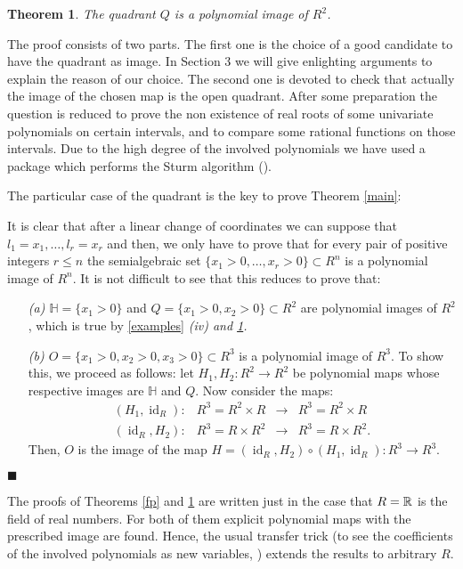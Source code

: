 \documentclass[11pt,draft]{article}
\newenvironment{proofmain}%
	{\par\noindent{\it Proof of Theorem \ref{main}.}\nopagebreak\normalsize}%
	{\hfill\linebreak[2]\hspace*{\fill}$\blacksquare$\\[5pt]}
\newtheorem{thm}{Theorem}[section]
\newcommand{\HH}{{\mathbb H}} \newcommand{\BB}{{\mathbb B}}
\newcommand{\id}{\operatorname{id}}
\begin{document}
\begin{thm}\label{q}
The quadrant $Q$ is a polynomial image of $R^2$.
\end{thm} 

The proof consists of two parts. The first one is the choice of a good candidate
to have the quadrant as image. In Section 3 we will give enlighting arguments to
explain the reason of our choice. The second one is devoted to check that
actually the image of the chosen map is the open quadrant. After some
preparation the question is reduced to prove the non existence of real roots of
some univariate polynomials on certain intervals, and to
compare some rational functions on those intervals. Due to the high degree of
the involved polynomials we have used a package which performs the Sturm
algorithm (\cite[1.2.10]{bcr}).

The particular case of the quadrant is the key to prove Theorem \ref{main}: 

\begin{proofmain}
It is clear that after a linear change of coordinates we can suppose that $l_1=x_1,\ldots,l_r=x_r$ 
and then, we only have to prove that
for every pair of positive integers $r\leq n$ the semialgebraic set 
$\{x_1>0,\ldots,x_r>0\}\subset R^n$ is a polynomial image of $ R^n$. It is not difficult to
see that this reduces to prove that:
\begin{itemize}
\item [\em (a) \em] $\HH=\{x_1>0\}$ and $Q=\{x_1>0,x_2>0\}\subset R^2$ are polynomial images
of $R^2$, which is true by \ref{examples} \em (iv) \em and \ref{q}.
\item [\em (b) \em] $O=\{x_1>0,x_2>0,x_3>0\}\subset R^3$ is a polynomial image of $R^3$. 
To show this, we proceed as follows: let $H_1,H_2:R^2\rightarrow R^2$ be polynomial maps
whose respective images are $\HH$ and $Q$. Now consider the maps:
$$
\begin{array}{lrcr}
(H_1,\id_R):& R^3=R^2\times R&\rightarrow& R^3= R^2\times R\\
(\id_R,H_2):& R^3=R\times R^2&\rightarrow& R^3= R\times R^2.
\end{array}
$$
Then, $O$ is the image of the map 
$H=(\id_R,H_2)\circ(H_1,\id_R):R^3\rightarrow R^3$.
\end{itemize}
\end{proofmain}

The proofs of Theorems \ref{fp} and \ref{q} are written just in the case that $R={\mathbb R}$ is the
field of real numbers. For both of them explicit polynomial maps with the prescribed image
are found. Hence, the usual transfer trick (to see the coefficients of the involved
polynomials as new variables, \cite{bcr}) extends the results to arbitrary $R$.
\end{document}
